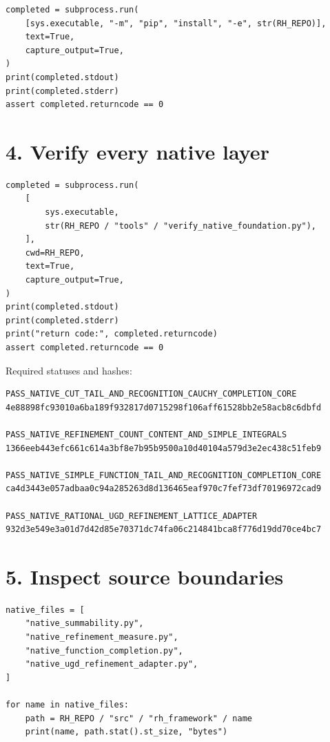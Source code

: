 \begin{verbatim}
completed = subprocess.run(
    [sys.executable, "-m", "pip", "install", "-e", str(RH_REPO)],
    text=True,
    capture_output=True,
)
print(completed.stdout)
print(completed.stderr)
assert completed.returncode == 0
\end{verbatim}

\hypertarget{verify-every-native-layer}{%
\section{4. Verify every native layer}\label{verify-every-native-layer}}

\begin{verbatim}
completed = subprocess.run(
    [
        sys.executable,
        str(RH_REPO / "tools" / "verify_native_foundation.py"),
    ],
    cwd=RH_REPO,
    text=True,
    capture_output=True,
)
print(completed.stdout)
print(completed.stderr)
print("return code:", completed.returncode)
assert completed.returncode == 0
\end{verbatim}

Required statuses and hashes:

\begin{verbatim}
PASS_NATIVE_CUT_TAIL_AND_RECOGNITION_CAUCHY_COMPLETION_CORE
4e88898fc93010a6ba189f932817d0715298f106aff61528bb2e58acb8c6dbfd

PASS_NATIVE_REFINEMENT_COUNT_CONTENT_AND_SIMPLE_INTEGRALS
1366eeb443efc661c614a3bf8e7b95b9500a10d40104a579d3e2ec438c51feb9

PASS_NATIVE_SIMPLE_FUNCTION_TAIL_AND_RECOGNITION_COMPLETION_CORE
ca4d3443e057adbaa0c94a285263d8d136465eaf970c7fef73df70196972cad9

PASS_NATIVE_RATIONAL_UGD_REFINEMENT_LATTICE_ADAPTER
932d3e549e3a01d7d42d85e70371dc74fa06c214841bca8f776d19dd70ce4bc7
\end{verbatim}

\hypertarget{inspect-source-boundaries}{%
\section{5. Inspect source boundaries}\label{inspect-source-boundaries}}

\begin{verbatim}
native_files = [
    "native_summability.py",
    "native_refinement_measure.py",
    "native_function_completion.py",
    "native_ugd_refinement_adapter.py",
]

for name in native_files:
    path = RH_REPO / "src" / "rh_framework" / name
    print(name, path.stat().st_size, "bytes")
\end{verbatim}

